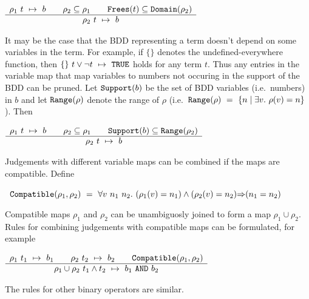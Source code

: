 \documentclass[12pt]{article}
\newcommand{\ml}[1]{{\tt #1}}
\newcommand{\termbdd}[3]{\mbox{$#1~#2~\mapsto~#3$}}
\newcommand\imp{{\Rightarrow}}
\begin{document}
\smallskip


$\begin{array}{c}
\termbdd{\rho_1}{t}{b} \qquad \rho_2\subseteq\rho_1 \qquad \ml{Frees}(t)\subseteq\ml{Domain}(\rho_2)
\\ \hline
\termbdd{\rho_2}{t}{b}
\end{array}$

\smallskip

It may be the case that the BDD representing a term doesn't depend on
some variables in the term. For example, if $\{\}$ denotes the
undefined-everywhere function, then $\termbdd{\{\}}{t\vee\neg
t}{\ml{TRUE}}$ holds for any term $t$. Thus any entries in the
variable map that map variables to numbers not occuring in the support
of the BDD can be pruned.  Let $\ml{Support}(b)$ be the set of BDD
variables (i.e.~numbers) in $b$ and let $\ml{Range}(\rho)$ denote the
range of $\rho$ (i.e.~$\ml{Range}(\rho)~=~\{n\mid \exists
v.~\rho(v)=n\}$). Then

\smallskip

$\begin{array}{c}
\termbdd{\rho_1}{t}{b} \qquad \rho_2\subseteq\rho_1 \qquad \ml{Support}(b)\subseteq\ml{Range}(\rho_2)
\\ \hline
\termbdd{\rho_2}{t}{b}
\end{array}$

\smallskip

Judgements with different variable maps can be combined if the maps are compatible.
Define 

\smallskip

~$\ml{Compatible}(\rho_1,\rho_2)~=~\forall v~n_1~n_2.~(\rho_1(v)=n_1)\wedge(\rho_2(v)=n_2)\imp(n_1=n_2)$

\smallskip

\noindent Compatible maps $\rho_1$ and $\rho_2$ can be unambiguosly
joined to form a map $\rho_1\cup \rho_2$. Rules for combining
judgements with compatible maps can be formulated, for example

\smallskip

$\begin{array}{c}
\termbdd{\rho_1}{t_1}{b_1} \qquad \termbdd{\rho_2}{t_2}{b_2} \qquad \ml{Compatible}(\rho_1,\rho_2)
\\ \hline
\termbdd{\rho_1\cup\rho_2}{t_1\wedge t_2}{b_1~\ml{AND}~ b_2}
\end{array}$


\smallskip

\noindent The rules for other binary operators are similar.
\end{document}
